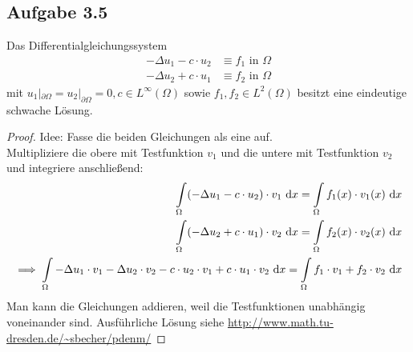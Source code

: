 \subsection{Aufgabe 3.5}
Das Differentialgleichungssystem
\begin{align*}
	-\Delta u_1-c\cdot u_2&\equiv f_1\text{ in }\Omega\\
	-\Delta u_2+c\cdot u_1&\equiv f_2\text{ in }\Omega
\end{align*}
mit $u_1|_{\partial\Omega}=u_2|_{\partial\Omega}=0,c\in L^\infty(\Omega)$ sowie $f_1,f_2\in L^2(\Omega)$ besitzt eine eindeutige schwache Lösung.

\begin{proof}
	Idee: Fasse die beiden Gleichungen als eine auf.\\
	Multipliziere die obere mit Testfunktion $v_1$ und die untere mit Testfunktion $v_2$ und integriere anschließend:
	\begin{align*}
		\int\limits_\Omega(-\Delta u_1-c\cdot u_2)\cdot v_1\text{ d} x=\int\limits_\Omega f_1(x)\cdot v_1(x)\text{ d} x\\
		\int\limits_\Omega(-\Delta u_2+c\cdot u_1)\cdot v_2\text{ d} x=\int\limits_\Omega f_2(x)\cdot v_2(x)\text{ d} x\\
		\implies
		\int\limits_\Omega -\Delta u_1\cdot v_1-\Delta u_2\cdot v_2-c\cdot u_2\cdot v_1+c\cdot u_1\cdot v_2\text{ d} x=\int\limits_\Omega f_1\cdot v_1+f_2\cdot v_2\text{ d} x
	\end{align*}
	Man kann die Gleichungen addieren, weil die Testfunktionen unabhängig voneinander sind.\nl
	Ausführliche Lösung siehe \url{http://www.math.tu-dresden.de/~sbecher/pdenm/}
\end{proof}
